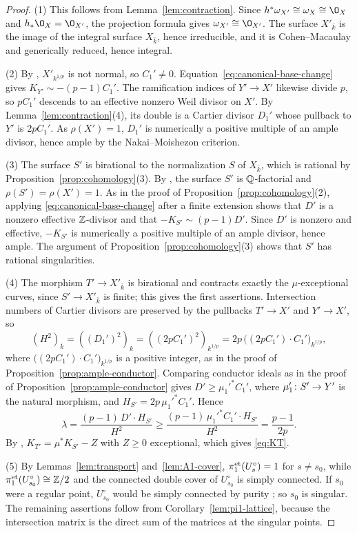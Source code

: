 \begin{proof}
(1) This follows from Lemma~\ref{lem:contraction}.
Since $h^*\omega_{X'}\cong\omega_X\cong\O_X$ and $h_*\O_X = \O_{X'}$, the projection formula gives $\omega_{X'}\cong\O_{X'}$.
The surface $X'_{\bar k}$ is the image of the integral surface $X_{\bar k}$, hence irreducible, and it is Cohen--Macaulay and generically reduced, hence integral.

(2) By \cite[Proposition~2.10(3)]{Tan21}, $X'_{k^{1/p}}$ is not normal, so $C_1'\neq 0$.
Equation~\eqref{eq:canonical-base-change} gives $K_{Y'}\sim-(p-1)C_1'$.
The ramification indices of $Y'\to X'$ likewise divide $p$, so $pC_1'$ descends to an effective nonzero Weil divisor on $X'$.
By Lemma~\ref{lem:contraction}(4), its double is a Cartier divisor $D_1'$ whose pullback to $Y'$ is $2pC_1'$.
As $\rho(X') = 1$, $D_1'$ is numerically a positive multiple of an ample divisor, hence ample by the Nakai--Moishezon criterion.

(3) The surface $S'$ is birational to the normalization $S$ of $X_{\bar k}$, which is rational by Proposition~\ref{prop:cohomology}(3).
By \cite[Proposition~2.4 and Lemma~2.5]{Tan18BC}, the surface $S'$ is $\mathbb{Q}$-factorial and $\rho(S') = \rho(X') = 1$.
As in the proof of Proposition~\ref{prop:cohomology}(2), applying \eqref{eq:canonical-base-change} after a finite extension shows that $D'$ is a nonzero effective $\mathbb{Z}$-divisor and that $-K_{S'}\sim(p-1)D'$.
Since $D'$ is nonzero and effective, $-K_{S'}$ is numerically a positive multiple of an ample divisor, hence ample.
The argument of Proposition~\ref{prop:cohomology}(3) shows that $S'$ has rational singularities.

(4) The morphism $T'\to X'_{\bar k}$ is birational and contracts exactly the $\mu$-exceptional curves, since $S'\to X'_{\bar k}$ is finite; this gives the first assertions.
Intersection numbers of Cartier divisors are preserved by the pullbacks $T'\to X'$ and $Y'\to X'$, so
\[
  (H^2)_{\bar k} = ((D_1')^2)_k = ((2pC_1')^2)_{k^{1/p}} = 2p\,\bigl((2pC_1')\cdot C_1'\bigr)_{k^{1/p}},
\]
where $\bigl((2pC_1')\cdot C_1'\bigr)_{k^{1/p}}$ is a positive integer, as in the proof of Proposition~\ref{prop:ample-conductor}.
Comparing conductor ideals as in the proof of Proposition~\ref{prop:ample-conductor} gives $D'\geq\mu_1'^*C_1'$, where $\mu_1'\colon S'\to Y'$ is the natural morphism, and $H_{S'} = 2p\,\mu_1'^*C_1'$.
Hence
\[
  \lambda = \frac{(p-1)\,D'\cdot H_{S'}}{H^2}\geq\frac{(p-1)\,\mu_1'^*C_1'\cdot H_{S'}}{H^2} = \frac{p-1}{2p}.
\]
By \cite[Theorem~10.5 and Claim~10.3.5]{Kol13}, $K_{T'} = \mu^*K_{S'}-Z$ with $Z\geq 0$ exceptional, which gives \eqref{eq:KT}.

(5) By Lemmas~\ref{lem:transport} and~\ref{lem:A1-cover}, $\pi_1^{\rm et}(U_s^\circ) = 1$ for $s\neq s_0$, while $\pi_1^{\rm et}(U_{s_0}^\circ)\cong\mathbb{Z}/2$ and the connected double cover of $U_{s_0}^\circ$ is simply connected.
If $s_0$ were a regular point, $U_{s_0}^\circ$ would be simply connected by purity \cite[Exp.~X, Corollaire~3.3]{SGA1}; so $s_0$ is singular.
The remaining assertions follow from Corollary~\ref{lem:pi1-lattice}, because the intersection matrix is the direct sum of the matrices at the singular points.
\end{proof}


